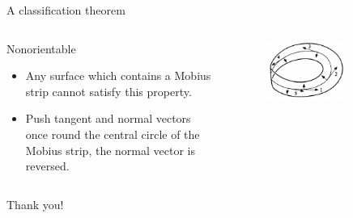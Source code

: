 \documentclass{beamer}
\begin{document}
\begin{frame}{A classification theorem}
  \begin{columns}
    \begin{column}{0.6\textwidth}
      \begin{block}{}
        Nonorientable
        \begin{itemize}
        \item Any surface which contains a Mobius strip cannot satisfy this property.
        \item Push tangent and normal vectors once round the central circle of the Mobius strip, the normal vector is reversed.
        \end{itemize}
      \end{block}
    \end{column}
    \begin{column}{0.4\textwidth}
      \begin{figure}
        \centering
        \includegraphics[width=0.7\textwidth]{figure_1_19_b.png}
        \caption{}
      \end{figure}
    \end{column}
  \end{columns}
\end{frame}

\begin{frame}
\Huge{\centerline{Thank you!}}
\end{frame}
\end{document}
